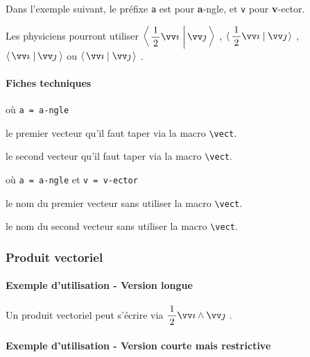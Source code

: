 \documentclass[12pt,a4paper]{article}
\theoremstyle{definition}
\begin{document}
Dans l'exemple suivant, le préfixe \verb+a+ est pour \textbf{a}-ngle, et  \verb+v+ pour \textbf{v}-ector.

\begin{tcblisting}{}
Les physiciens pourront utiliser
$\displaystyle \adotprod{\frac{1}{2} \vect{i}}{\vect{j}}$ ,
$\displaystyle \adotprod*{\frac{1}{2} \vect{i}}{\vect{j}}$ ,
$\displaystyle \vadotprod{i}{j}$
ou
$\displaystyle \vadotprod*{i}{j}$ .
\end{tcblisting}


\paragraph{Fiches techniques}

 où \quad \verb&a = a-ngle&


 le premier vecteur qu'il faut taper via la macro \verb+\vect+.

 le second vecteur qu'il faut taper via la macro \verb+\vect+.


\bigskip


 où \quad \verb&a = a-ngle& et \verb+v = v-ector+

 le nom du premier vecteur sans utiliser la macro \verb+\vect+.

 le nom du second vecteur sans utiliser la macro \verb+\vect+.





		\subsubsection{Produit vectoriel}

\paragraph{Exemple d'utilisation - Version longue}

\begin{tcblisting}{}
Un produit vectoriel peut s'écrire via $\crossprod{\dfrac{1}{2} \vect{i}}{\vect{j}}$ .
\end{tcblisting}


\paragraph{Exemple d'utilisation - Version courte mais restrictive}
\end{document}
